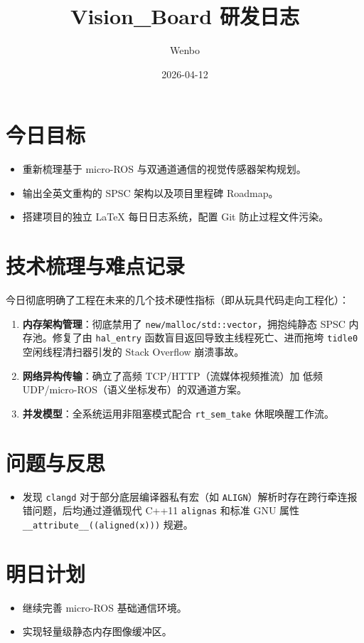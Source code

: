 \documentclass[cn, chinesefont=nofont, color=black, device=normal, 11pt]{elegantnote}
\title{Vision\_Board 研发日志}
\author{Wenbo}
\date{2026-04-12}
\begin{document}
\maketitle

\section{今日目标}
\begin{itemize}
    \item 重新梳理基于 micro-ROS 与双通道通信的视觉传感器架构规划。
    \item 输出全英文重构的 SPSC 架构以及项目里程碑 Roadmap。
    \item 搭建项目的独立 \LaTeX{} 每日日志系统，配置 Git 防止过程文件污染。
\end{itemize}

\section{技术梳理与难点记录}
今日彻底明确了工程在未来的几个技术硬性指标（即从玩具代码走向工程化）：
\begin{enumerate}
    \item \textbf{内存架构管理}：彻底禁用了 \texttt{new/malloc/std::vector}，拥抱纯静态 SPSC 内存池。修复了由 \texttt{hal\_entry} 函数盲目返回导致主线程死亡、进而拖垮 \texttt{tidle0} 空闲线程清扫器引发的 Stack Overflow 崩溃事故。
    \item \textbf{网络异构传输}：确立了高频 TCP/HTTP（流媒体视频推流）加 低频 UDP/micro-ROS（语义坐标发布）的双通道方案。
    \item \textbf{并发模型}：全系统运用非阻塞模式配合 \texttt{rt\_sem\_take} 休眠唤醒工作流。
\end{enumerate}

\section{问题与反思}
\begin{itemize}
    \item 发现 \texttt{clangd} 对于部分底层编译器私有宏（如 \texttt{ALIGN}）解析时存在跨行牵连报错问题，后均通过遵循现代 C++11 \texttt{alignas} 和标准 GNU 属性 \texttt{\_\_attribute\_\_((aligned(x)))} 规避。
\end{itemize}

\section{明日计划}
\begin{itemize}
    \item 继续完善 micro-ROS 基础通信环境。
    \item 实现轻量级静态内存图像缓冲区。
\end{itemize}
\end{document}
